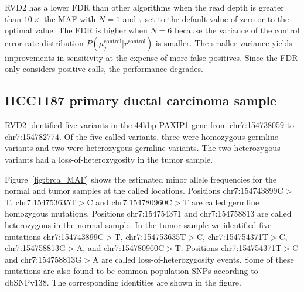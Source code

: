 \documentclass[11pt,reqno]{amsart}
\begin{document}
RVD2 has a lower FDR than other algorithms when the read depth is greater than $10\times$ the MAF with $N=1$ and $\tau$ set to the default value of zero or to the optimal value. The FDR is higher when $N=6$ because the variance of the control error rate distribution $P(\mu_j^{\text{control}} | r^{\text{control}})$ is smaller. The smaller variance yields improvements in sensitivity at the expense of more false positives. Since the FDR only considers positive calls, the performance degrades.


\subsection{HCC1187 primary ductal carcinoma sample}\label{sec:brca}

RVD2 identified five variants in the 44kbp PAXIP1 gene from chr7:154738059 to chr7:154782774. Of the five called variants, three were homozygous germline variants and two were heterozygous germline variants. The two heterozygous variants had a loss-of-heterozygosity in the tumor sample. 

Figure~\ref{fig:brca_MAF} shows the estimated minor allele frequencies for the normal and tumor samples at the called locations. Positions chr7:154743899C$>$T, chr7:154753635T$>$C and chr7:154780960C$>$T are called germline homozygous mutations. Positions chr7:154754371 and chr7:154758813 are called heterozygous in the normal sample. In the tumor sample we identified five mutations chr7:154743899C$>$T, chr7:154753635T$>$C, chr7:154754371T$>$C, chr7:154758813G$>$A, and chr7:154780960C$>$T. Positions chr7:154754371T$>$C and chr7:154758813G$>$A are called loss-of-heterozygosity events. Some of these mutations are also found to be common population SNPs according to dbSNPv138. The corresponding identities are shown in the figure.
\end{document}
